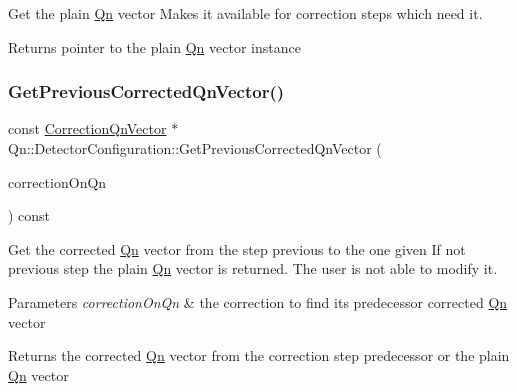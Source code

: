 Get the plain \mbox{\hyperlink{namespaceQn}{Qn}} vector Makes it available for correction steps which need it. \begin{DoxyReturn}{Returns}
pointer to the plain \mbox{\hyperlink{namespaceQn}{Qn}} vector instance 
\end{DoxyReturn}
\mbox{\label{classQn_1_1DetectorConfiguration_aac09cc211d9fc911b61dbe14fdc4f5f3}} 
\subsubsection{\texorpdfstring{Get\+Previous\+Corrected\+Qn\+Vector()}{GetPreviousCorrectedQnVector()}}
{\footnotesize\ttfamily const \mbox{\hyperlink{classQn_1_1CorrectionQnVector}{Correction\+Qn\+Vector}} $\ast$ Qn\+::\+Detector\+Configuration\+::\+Get\+Previous\+Corrected\+Qn\+Vector (\begin{DoxyParamCaption}\item[{\mbox{\hyperlink{classQn_1_1CorrectionOnQvector}{Correction\+On\+Qvector}} $\ast$}]{correction\+On\+Qn }\end{DoxyParamCaption}) const}

Get the corrected \mbox{\hyperlink{namespaceQn}{Qn}} vector from the step previous to the one given If not previous step the plain \mbox{\hyperlink{namespaceQn}{Qn}} vector is returned. The user is not able to modify it. 
\begin{DoxyParams}{Parameters}
{\em correction\+On\+Qn} & the correction to find its predecessor corrected \mbox{\hyperlink{namespaceQn}{Qn}} vector \\
\hline
\end{DoxyParams}
\begin{DoxyReturn}{Returns}
the corrected \mbox{\hyperlink{namespaceQn}{Qn}} vector from the correction step predecessor or the plain \mbox{\hyperlink{namespaceQn}{Qn}} vector 
\end{DoxyReturn}
\mbox{\label{classQn_1_1DetectorConfiguration_a4298530954cc8dabbd41b1fd83d6310f}} 
